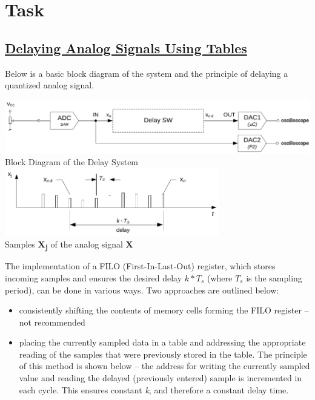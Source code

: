 \documentclass{article}
\begin{document}
\section*{Task}
\subsection*{\underline{Delaying Analog Signals Using Tables}}
Below is a basic block diagram of the system and the principle of delaying a quantized analog signal.

\begin{center}
\includegraphics[width=\textwidth]{"../img/ADC_delay_DAC_1.png"} \\
Block Diagram of the Delay System \\
\vspace{5mm}
\includegraphics[width=0.7\textwidth]{"../img/ADC_delay_DAC_2.png"} \\
Samples \textbf{X\textsubscript{j}} of the analog signal \textbf{X}
\end{center}

The implementation of a FILO (First-In-Last-Out) register, which stores incoming samples and ensures the desired delay $k * T_s$ (where $T_s$ is the sampling period), can be done in various ways. Two approaches are outlined below:
\begin{itemize}
    \item consistently shifting the contents of memory cells forming the FILO register – not recommended
    \item placing the currently sampled data in a table and addressing the appropriate reading of the samples that were previously stored in the table. The principle of this method is shown below – the address for writing the currently sampled value and reading the delayed (previously entered) sample is incremented in each cycle. This ensures constant \textit{k}, and therefore a constant delay time.
\end{itemize}
\end{document}
